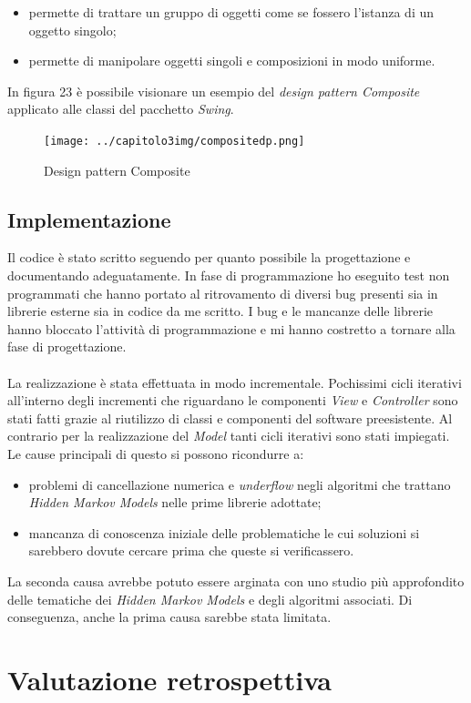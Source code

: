 \begin{itemize}
\item permette di trattare un gruppo di oggetti come se fossero l'istanza di un oggetto singolo;
\item permette di manipolare oggetti singoli e composizioni in modo uniforme.
\end{itemize}
In figura 23 è possibile visionare un esempio del \emph{design pattern Composite} applicato alle classi del pacchetto \emph{Swing}.
\begin{figure}[H]
\centering
\texttt{[image: ../capitolo3img/compositedp.png]}
\caption{Design pattern Composite}
\end{figure}

\subsection{Implementazione}
\label{3.4}
Il codice è stato scritto seguendo per quanto possibile la progettazione e documentando adeguatamente. In fase di programmazione ho eseguito test non programmati che hanno portato al ritrovamento di diversi bug presenti sia in librerie esterne sia in codice da me scritto. I bug e le mancanze delle librerie hanno bloccato l'attività di programmazione e mi hanno costretto a tornare alla fase di progettazione.\\\\
La realizzazione è stata effettuata in modo incrementale. Pochissimi cicli iterativi all'interno degli incrementi che riguardano le componenti \emph{View} e \emph{Controller} sono stati fatti grazie al riutilizzo di classi e componenti del software preesistente. Al contrario per la realizzazione del \emph{Model} tanti cicli iterativi sono stati impiegati. Le cause principali di questo si possono ricondurre a:
\begin{itemize}
\item problemi di cancellazione numerica e \emph{underflow} negli algoritmi che trattano \emph{Hidden Markov Models} nelle prime librerie adottate;
\item mancanza di conoscenza iniziale delle problematiche le cui soluzioni si sarebbero dovute cercare prima che queste si verificassero.
\end{itemize}
La seconda causa avrebbe potuto essere arginata con uno studio più approfondito delle tematiche dei \emph{Hidden Markov Models} e degli algoritmi associati. Di conseguenza, anche la prima causa sarebbe stata limitata.
\newpage
\section{Valutazione retrospettiva}
\label{4.0}

